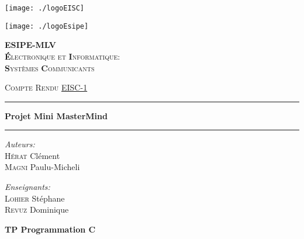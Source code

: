 \begin{titlepage} \begin{center}

    \begin{minipage}{0.48\textwidth} \begin{flushleft}
		\texttt{[image: ./logoEISC]}
    \end{flushleft}\end{minipage}
    \begin{minipage}{0.48\textwidth} \begin{flushright}
		\texttt{[image: ./logoEsipe]}
    \end{flushright}\end{minipage}
    
    \textsc{\huge{\textbf{ESIPE-MLV}}}\\
    \vspace{5mm}
    \textsc{\LARGE{\textbf{\'E}lectronique et \textbf{I}nformatique: \\ 
    			\textbf{S}ystèmes \textbf{C}ommunicants}} 

	\vfill
		\textsc{\LARGE Compte Rendu}
	\vfill
	    \underline {EISC-1}    
    \vfill
	
    \hrule \vfill
		{\huge \bfseries \textsc Projet Mini MasterMind }
    \vfill \hrule
    
    \vfill
    \begin{minipage}{0.48\textwidth} \begin{flushleft} \large
        \emph{Auteurs:}\\	
        \textsc{Hérat} Clément\\
        \textsc{Magni} Paulu-Micheli
	\end{flushleft}	\end{minipage}
    \begin{minipage}{0.48\textwidth} \begin{flushright} \large
        \emph{Enseignants:}\\	
        \textsc{Lohier} Stéphane\\
        \textsc{Revuz} Dominique
	\end{flushright} \end{minipage}
    
    \vfill
    	\textbf{\Large{ TP Programmation C}}
    \vfill
    
	\large{}
\end{center} \end{titlepage}